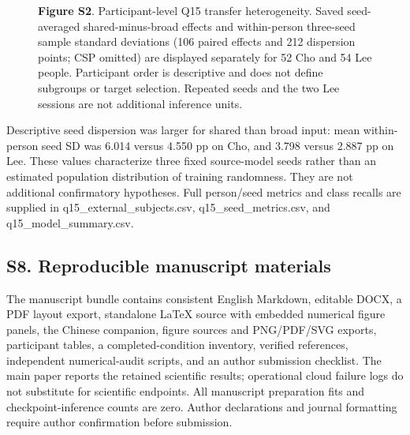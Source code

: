 \documentclass[11pt]{article}
\begin{document}
\begin{figure}[htbp]
{
}
\caption*{\textbf{Figure S2}. Participant-level Q15 transfer heterogeneity. Saved seed-averaged shared-minus-broad effects and within-person three-seed sample standard deviations (106 paired effects and 212 dispersion points; CSP omitted) are displayed separately for 52 Cho and 54 Lee people. Participant order is descriptive and does not define subgroups or target selection. Repeated seeds and the two Lee sessions are not additional inference units.}
\end{figure}
Descriptive seed dispersion was larger for shared than broad input: mean within-person seed SD was 6.014 versus 4.550 pp on Cho, and 3.798 versus 2.887 pp on Lee. These values characterize three fixed source-model seeds rather than an estimated population distribution of training randomness. They are not additional confirmatory hypotheses. Full person/seed metrics and class recalls are supplied in q15\_external\_subjects.csv, q15\_seed\_metrics.csv, and q15\_model\_summary.csv.

\subsection*{S8. Reproducible manuscript materials}
The manuscript bundle contains consistent English Markdown, editable DOCX, a PDF layout export, standalone LaTeX source with embedded numerical figure panels, the Chinese companion, figure sources and PNG/PDF/SVG exports, participant tables, a completed-condition inventory, verified references, independent numerical-audit scripts, and an author submission checklist. The main paper reports the retained scientific results; operational cloud failure logs do not substitute for scientific endpoints. All manuscript preparation fits and checkpoint-inference counts are zero. Author declarations and journal formatting require author confirmation before submission.
\end{document}
